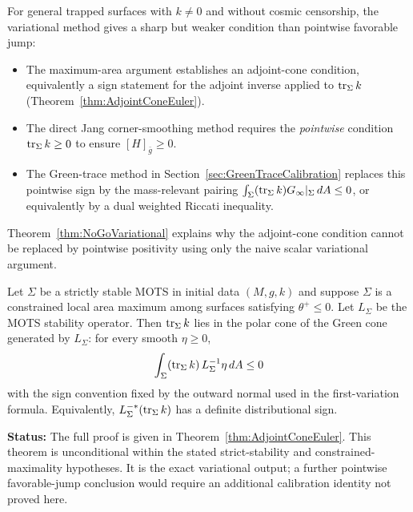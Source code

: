 \begin{remark}\label{rem:intro-gap}\label{rem:NonSelfAdjointGap}
For general trapped surfaces with $k \neq 0$ and without cosmic censorship, the variational method gives a sharp but weaker condition than pointwise favorable jump:
\begin{itemize}
    \item The maximum-area argument establishes an adjoint-cone condition, equivalently a sign statement for the adjoint inverse applied to $\operatorname{tr}_\Sigma k$ (Theorem~\ref{thm:AdjointConeEuler}).
    \item The direct Jang corner-smoothing method requires the \emph{pointwise} condition $\operatorname{tr}_\Sigma k \geq 0$ to ensure $[H]_{\bar{g}} \ge 0$.
    \item The Green-trace method in Section~\ref{sec:GreenTraceCalibration} replaces this pointwise sign by the mass-relevant pairing \(\int_\Sigma(\operatorname{tr}_\Sigma k)G_\infty|_\Sigma\,dA\le0\), or equivalently by a dual weighted Riccati inequality.
\end{itemize}
Theorem~\ref{thm:NoGoVariational} explains why the adjoint-cone condition cannot be replaced by pointwise positivity using only the naive scalar variational argument.
\end{remark}

\begin{theorem}\label{thm:IntroAdjointConeEuler}
Let $\Sigma$ be a strictly stable MOTS in initial data $(M,g,k)$ and suppose $\Sigma$ is a constrained local area maximum among surfaces satisfying $\theta^+\le0$. Let $L_\Sigma$ be the MOTS stability operator. Then $\operatorname{tr}_\Sigma k$ lies in the polar cone of the Green cone generated by $L_\Sigma$: for every smooth $\eta\ge0$,
\[
    \int_\Sigma (\operatorname{tr}_\Sigma k)\, L_\Sigma^{-1}\eta\,dA \le 0
\]
with the sign convention fixed by the outward normal used in the first-variation formula. Equivalently, $L_\Sigma^{-*}(\operatorname{tr}_\Sigma k)$ has a definite distributional sign.

\textbf{Status:} The full proof is given in Theorem~\ref{thm:AdjointConeEuler}. This theorem is unconditional within the stated strict-stability and constrained-maximality hypotheses. It is the exact variational output; a further pointwise favorable-jump conclusion would require an additional calibration identity not proved here.
\end{theorem}

